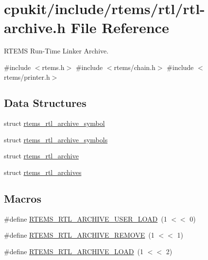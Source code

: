 \hypertarget{rtl-archive_8h}{}\section{cpukit/include/rtems/rtl/rtl-\/archive.h File Reference}
\label{rtl-archive_8h}


R\+T\+E\+MS Run-\/\+Time Linker Archive.  


{\ttfamily \#include $<$rtems.\+h$>$}\newline
{\ttfamily \#include $<$rtems/chain.\+h$>$}\newline
{\ttfamily \#include $<$rtems/printer.\+h$>$}\newline
\subsection*{Data Structures}
\begin{DoxyCompactItemize}
\item 
struct \mbox{\hyperlink{structrtems__rtl__archive__symbol}{rtems\+\_\+rtl\+\_\+archive\+\_\+symbol}}
\item 
struct \mbox{\hyperlink{structrtems__rtl__archive__symbols}{rtems\+\_\+rtl\+\_\+archive\+\_\+symbols}}
\item 
struct \mbox{\hyperlink{structrtems__rtl__archive}{rtems\+\_\+rtl\+\_\+archive}}
\item 
struct \mbox{\hyperlink{structrtems__rtl__archives}{rtems\+\_\+rtl\+\_\+archives}}
\end{DoxyCompactItemize}
\subsection*{Macros}
\begin{DoxyCompactItemize}
\item 
\#define \mbox{\hyperlink{rtl-archive_8h_a3b3e926b4fdf2965140136ef42090656}{R\+T\+E\+M\+S\+\_\+\+R\+T\+L\+\_\+\+A\+R\+C\+H\+I\+V\+E\+\_\+\+U\+S\+E\+R\+\_\+\+L\+O\+AD}}~(1 $<$$<$ 0)
\item 
\#define \mbox{\hyperlink{rtl-archive_8h_a1152d3370fc56cec9d6ee6e9bc8437c6}{R\+T\+E\+M\+S\+\_\+\+R\+T\+L\+\_\+\+A\+R\+C\+H\+I\+V\+E\+\_\+\+R\+E\+M\+O\+VE}}~(1 $<$$<$ 1)
\item 
\#define \mbox{\hyperlink{rtl-archive_8h_a4cc66c432383d2e1bb1593318f027821}{R\+T\+E\+M\+S\+\_\+\+R\+T\+L\+\_\+\+A\+R\+C\+H\+I\+V\+E\+\_\+\+L\+O\+AD}}~(1 $<$$<$ 2)
\end{DoxyCompactItemize}
